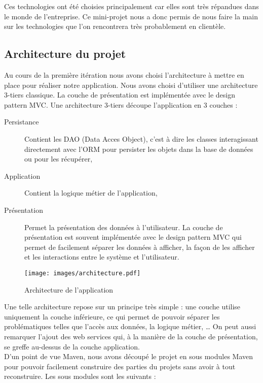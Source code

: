 Ces technologies ont été choisies principalement car elles sont très répandues dans le monde de l'entreprise. Ce mini-projet nous a donc permis de nous faire la main sur les technologies que l'on rencontrera très probablement en clientèle.

\subsection{Architecture du projet}

Au cours de la première itération nous avons choisi l'architecture à mettre en place pour réaliser notre application. Nous avons choisi d'utiliser une architecture 3-tiers classique. La couche de présentation est implémentée avec le design pattern MVC. Une architecture 3-tiers découpe l'application en 3 couches :

\begin{description}
	\item[Persistance] Contient les DAO (Data Acces Object), c'est à dire les classes interagissant directement avec l'ORM pour persister les objets dans la base de données ou pour les récupérer,
	
	\item[Application] Contient la logique métier de l'application,
	
	\item[Présentation] Permet la présentation des données à l'utilisateur. La couche de présentation est souvent implémentée avec le design pattern MVC qui permet de facilement séparer les données à afficher, la façon de les afficher et les interactions entre le système et l'utilisateur.
\end{description}

\begin{figure}[H]
	\centering
	\texttt{[image: images/architecture.pdf]}
	\caption{Architecture de l'application}
\end{figure}

Une telle architecture repose sur un principe très simple : une couche utilise uniquement la couche inférieure, ce qui permet de pouvoir séparer les problématiques telles que l'accès aux données, la logique métier, \dots{} On peut aussi remarquer l'ajout des web services qui, à la manière de la couche de présentation, se greffe au-dessus de la couche application.\\

D'un point de vue Maven, nous avons découpé le projet en sous modules Maven pour pouvoir facilement construire des parties du projets sans avoir à tout reconstruire. Les sous modules sont les suivants :

